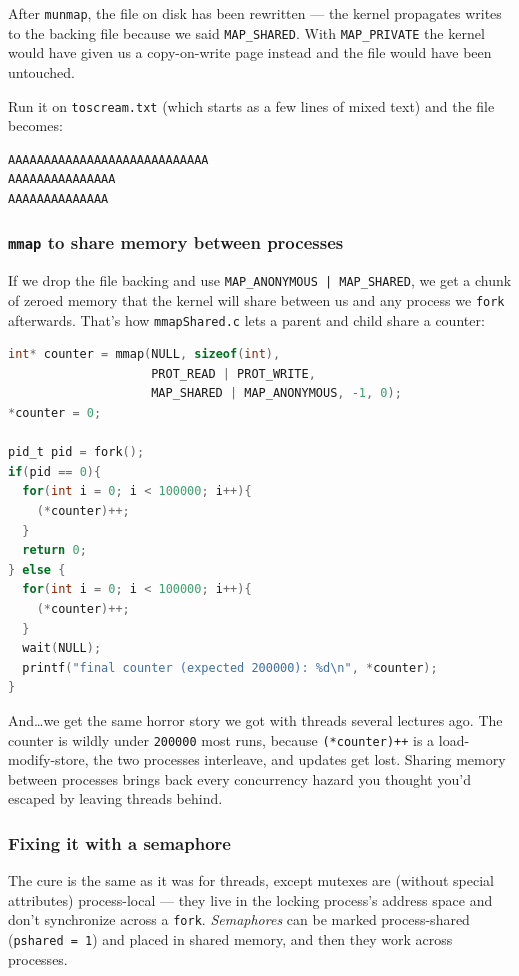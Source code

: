 \documentclass[11pt]{article}
\begin{document}
After \texttt{munmap}, the file on disk has been rewritten --- the
kernel propagates writes to the backing file because we said
\texttt{MAP\_SHARED}. With \texttt{MAP\_PRIVATE} the kernel would
have given us a copy-on-write page instead and the file would have
been untouched.

Run it on \texttt{toscream.txt} (which starts as a few lines of
mixed text) and the file becomes:

\begin{lstlisting}
AAAAAAAAAAAAAAAAAAAAAAAAAAAA
AAAAAAAAAAAAAAA
AAAAAAAAAAAAAA
\end{lstlisting}

\subsubsection*{\texttt{mmap} to share memory between processes}

If we drop the file backing and use \texttt{MAP\_ANONYMOUS |
MAP\_SHARED}, we get a chunk of zeroed memory that the kernel
will share between us and any process we \texttt{fork} afterwards.
That's how \texttt{mmapShared.c} lets a parent and child share a
counter:

\begin{lstlisting}[language=C]
int* counter = mmap(NULL, sizeof(int),
                    PROT_READ | PROT_WRITE,
                    MAP_SHARED | MAP_ANONYMOUS, -1, 0);
*counter = 0;

pid_t pid = fork();
if(pid == 0){
  for(int i = 0; i < 100000; i++){
    (*counter)++;
  }
  return 0;
} else {
  for(int i = 0; i < 100000; i++){
    (*counter)++;
  }
  wait(NULL);
  printf("final counter (expected 200000): %d\n", *counter);
}
\end{lstlisting}

And\ldots we get the same horror story we got with threads several
lectures ago. The counter is wildly under \texttt{200000} most runs,
because \texttt{(*counter)++} is a load-modify-store, the two
processes interleave, and updates get lost. Sharing memory between
processes brings back every concurrency hazard you thought you'd
escaped by leaving threads behind.

\subsubsection*{Fixing it with a semaphore}

The cure is the same as it was for threads, except mutexes are
(without special attributes) process-local --- they live in the
locking process's address space and don't synchronize across a
\texttt{fork}. \emph{Semaphores} can
be marked process-shared (\texttt{pshared = 1}) and placed in shared
memory, and then they work across processes.
\end{document}
